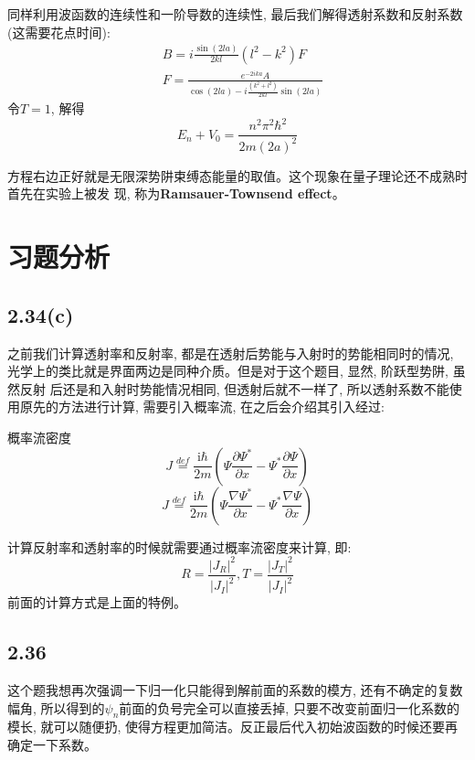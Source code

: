 \documentclass[a4paper,zihao=-4,linespread=1]{ctexrep}
\begin{document}
    同样利用波函数的连续性和一阶导数的连续性, 最后我们解得透射系数和反射系数(这需要花点时间):
    \begin{equation}
        \begin{aligned}
        &B=i \frac{\sin (2 l a)}{2 k l}\left(l^{2}-k^{2}\right) F \\
        &F=\frac{e^{-2 i k a} A}{\cos (2 l a)-i \frac{\left(k^{2}+l^{2}\right)}{2 k l} \sin (2 l a)}
        \end{aligned}
    \end{equation}
    令$T=1$, 解得$$E_n+V_0=\frac{n^2\pi^2\hbar^2}{2m(2a)^2}$$
    
    方程右边正好就是无限深势阱束缚态能量的取值。这个现象在量子理论还不成熟时首先在实验上被发
    现, 称为\textbf{Ramsauer-Townsend effect}。
    \newpage
    \section{习题分析}
    \subsection*{2.34(c)}
    之前我们计算透射率和反射率, 都是在透射后势能与入射时的势能相同时的情况, 光学上的类比就是界面两边是同种介质。但是对于这个题目, 显然, 阶跃型势阱, 虽然反射
    后还是和入射时势能情况相同, 但透射后就不一样了, 所以透射系数不能使用原先的方法进行计算, 需要引入概率流, 在之后会介绍其引入经过:
    \begin{define}{概率流密度}
        \begin{equation*}
            J\overset{def}{=}\frac{\mathrm{i} \hbar}{2 m}\left(\Psi \frac{\partial \Psi^{*}}{\partial x}-\Psi^{*} \frac{\partial \Psi}{\partial x}\right)\tag{1-D}
        \end{equation*}
        \begin{equation}
            J\overset{def}{=}\frac{\mathrm{i} \hbar}{2 m}\left(\Psi \frac{\nabla \Psi^{*}}{\partial x}-\Psi^{*} \frac{\nabla \Psi}{\partial x}\right)\tag{2-D}
        \end{equation}
    \end{define}
    计算反射率和透射率的时候就需要通过概率流密度来计算, 即:
    \begin{equation}
        R=\frac{|J_R|^2}{|J_I|^2},T=\frac{|J_T|^2}{|J_I|^2}
    \end{equation}
    前面的计算方式是上面的特例。
    \subsection*{2.36}
    这个题我想再次强调一下归一化只能得到解前面的系数的模方, 还有不确定的复数幅角, 所以得到的$\psi_n$前面的负号完全可以直接丢掉, 只要不改变前面归一化系数的
    模长, 就可以随便扔, 使得方程更加简洁。反正最后代入初始波函数的时候还要再确定一下系数。
\end{document}
